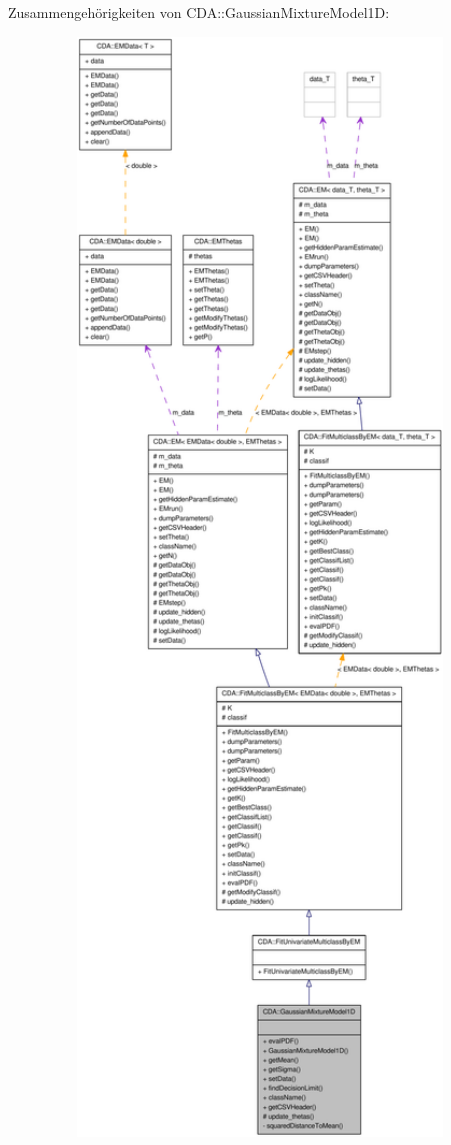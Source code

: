 Zusammengehörigkeiten von CDA::GaussianMixtureModel1D:\nopagebreak
\begin{figure}[H]
\begin{center}
\leavevmode
\includegraphics[width=400pt]{classCDA_1_1GaussianMixtureModel1D__coll__graph}
\end{center}
\end{figure}
